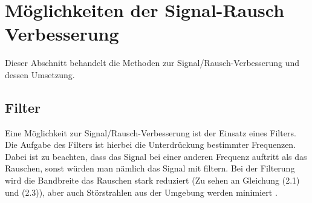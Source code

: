 \newpage
\section{Möglichkeiten der Signal-Rausch Verbesserung}
\label{sec:verbesserung}
Dieser Abschnitt behandelt die Methoden zur Signal/Rausch-Verbesserung und dessen Umsetzung.
\subsection{Filter}
\label{sub:filter}
Eine Möglichkeit zur Signal/Rausch-Verbesserung ist der Einsatz eines Filters. Die Aufgabe des Filters ist hierbei die Unterdrückung bestimmter Frequenzen. Dabei ist zu beachten, dass das Signal bei einer anderen Frequenz auftritt als das Rauschen, sonst würden man nämlich das Signal mit filtern. Bei der Filterung wird die Bandbreite das Rauschen stark reduziert (Zu sehen an Gleichung (2.1) und (2.3)), aber auch Störstrahlen aus der Umgebung werden minimiert \citep{VA}.
